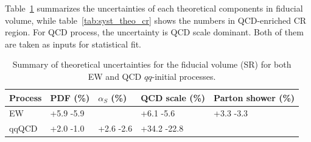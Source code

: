 Table~\ref{tab:syst_theo_sr} summarizes the uncertainties of each theoretical components in fiducial volume,
while table~\ref{tab:syst_theo_cr} shows the numbers in QCD-enriched CR region.
For QCD process, the uncertainty is QCD scale dominant.
Both of them are taken as inputs for statistical fit.
\begin{table}[!htb]
\small
\begin{center}
\begin{tabular}{lllll} 
\hline\hline
Process     & PDF (\%)  & $\alpha_{S}$ (\%) & QCD scale (\%) & Parton shower (\%) \\
\hline
EW         & +5.9 -5.9 &                   & +6.1 -5.6      & +3.3 -3.3          \\
qqQCD      & +2.0 -1.0 & +2.6 -2.6         & +34.2 -22.8    &                    \\
\hline\hline
\end{tabular}
\caption{
Summary of theoretical uncertainties for the fiducial volume (SR) for both EW and QCD $qq$-initial processes.
}
\label{tab:syst_theo_sr}
\end{center}
\end{table}

